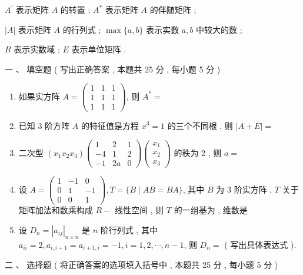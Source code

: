 \documentclass[10pt]{article}
\begin{document}
{$A^{\prime}$  表示矩阵  $A$  的转置 ; $A^{*}$  表示矩阵  $A$  的伴随矩阵 ;

$|A|$  表示矩阵  $A$  的行列式 ; $\max \{a, b\}$  表示实数  $a, b$  中较大的数 ;

$R$  表示实数域 ; $E$  表示单位矩阵 .

 一 、 填空题 ( 写出正确答案 ,  本题共  25  分 , 每小题  5  分 )

\begin{enumerate}
  \item  如果实方阵  $A=\left(\begin{array}{lll}1 & 1 & 1 \\ 1 & 1 & 1 \\ 1 & 1 & 1\end{array}\right)$,  则  $A^{*}=$

  \item  已知  3  阶方阵  $A$  的特征值是方程  $x^{3}=1$  的三个不同根 ,  则  $|A+E|=$

  \item  二次型  $\left(x_{1} x_{2} x_{3}\right)\left(\begin{array}{ccc}1 & 2 & 1 \\ -4 & 1 & 2 \\ -1 & 2 a & 0\end{array}\right)\left(\begin{array}{l}x_{1} \\ x_{2} \\ x_{3}\end{array}\right)$  的秩为  2 ,  则  $a=$

  \item  设  $A=\left(\begin{array}{ccc}1 & -1 & 0 \\ 0 & 1 & -1 \\ 0 & 0 & 1\end{array}\right), T=\{B \mid A B=B A\}$,  其中  $B$  为  3  阶实方阵 , $T$  关于矩阵加法和数乘构成  $R-$  线性空间 ,  则  $T$  的一组基为  ,  维数是 

  \item  设  $D_{n}=\left|a_{i j}\right|_{n \times n}$  是  $n$  阶行列式 ,  其中  $a_{i i}=2, a_{i, i+1}=a_{i+1, i}=-1, i=1,2, \cdots, n-1$,  则  $D_{n}=$ ( 写出具体表达式 ).

\end{enumerate}
 二 、 选择题 ( 将正确答案的选项填入括号中 ,  本题共  25  分 ,  每小题  5  分 )

}
\end{document}
